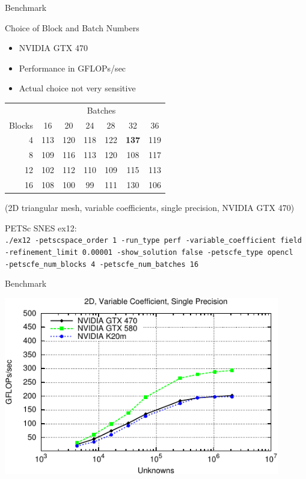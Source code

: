 \begin{frame}{Benchmark}
 \begin{block}{Choice of Block and Batch Numbers}
 \begin{itemize}
  \item NVIDIA GTX 470
  \item Performance in GFLOPs/sec
  \item Actual choice not very sensitive
 \end{itemize}
 \end{block}
 
 \begin{center}
  \begin{tabular}{|r||c|c|c|c|c|c|}
    \hline
           & \multicolumn{6}{c|}{Batches} \\
    Blocks & 16 & 20 & 24 & 28 & 32 & 36 \\
    \hline
    \hline
      4    & 113 & 120 & 118 & 122 & \textbf{137} & 119 \\
      8    & 109 & 116 & 113 & 120 & 108 & 117 \\
     12    & 102 & 112 & 110 & 109 & 115 & 113 \\ 
     16    & 108 & 100 &  99 & 111 & 130 & 106 \\ 
    \hline
  \end{tabular}
  
  \vspace*{.3cm}
   {\small (2D triangular mesh, variable coefficients, single precision, NVIDIA GTX 470)}
 \end{center}

   {\small PETSc SNES ex12: \\
    {\footnotesize \texttt{./ex12 -petscspace\_order 1 -run\_type perf -variable\_coefficient field \\
            -refinement\_limit 0.00001 -show\_solution false -petscfe\_type opencl \\
            -petscfe\_num\_blocks 4 -petscfe\_num\_batches 16}}}
 

\end{frame}



\begin{frame}{Benchmark}
 \begin{center}
  \includegraphics[width=0.9\textwidth]{figures/2d_variable_float-crop}
 \end{center}
\end{frame}

